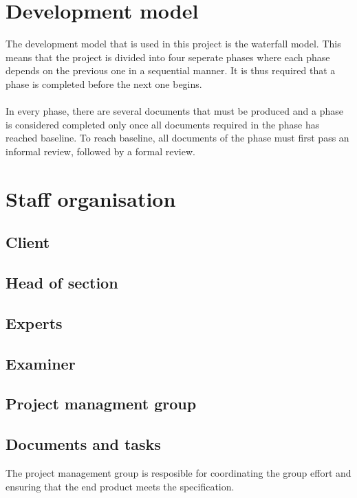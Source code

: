 \documentclass{article}
\begin{document}
\section{Development model} %
    The development model that is used in this project is the waterfall model. This
    means that the project is divided into four seperate phases where each phase depends
    on the previous one in a sequential manner. It is thus required that a phase is
    completed before the next one begins.
    \\ \\
    In every phase, there are several documents that must be produced and a phase
    is considered completed only once all documents required in the phase has reached baseline.
    To reach baseline, all documents of the phase must first pass an informal review, 
    followed by a formal review.
    
\section{Staff organisation} %

    \subsection{Client}
    
    \subsection{Head of section}
    
    \subsection{Experts}
    
    \subsection{Examiner}
    
    \subsection{Project managment group}
        \subsection{Documents and tasks}
            The project management group is resposible for coordinating the group effort and ensuring that the end product meets the specification. 
            
\end{document}

